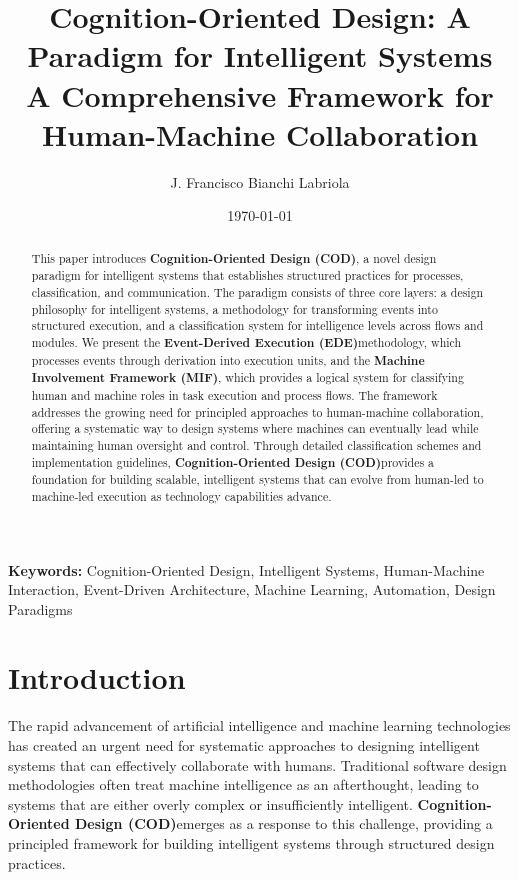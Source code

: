 \documentclass[12pt,a4paper]{article}
\title{\Large \textbf{Cognition-Oriented Design: A Paradigm for Intelligent Systems}\\[0.5cm] \large A Comprehensive Framework for Human-Machine Collaboration}
\author{J. Francisco Bianchi Labriola}
\affil{Independent author}
\date{\today}
\newcommand{\cod}{\textbf{Cognition-Oriented Design (COD)}}
\newcommand{\ede}{\textbf{Event-Derived Execution (EDE)}}
\newcommand{\mif}{\textbf{Machine Involvement Framework (MIF)}}
\begin{document}
\maketitle
\thispagestyle{empty}

\begin{abstract}
This paper introduces \cod, a novel design paradigm for intelligent systems that establishes structured practices for processes, classification, and communication. The paradigm consists of three core layers: a design philosophy for intelligent systems, a methodology for transforming events into structured execution, and a classification system for intelligence levels across flows and modules. We present the \ede methodology, which processes events through derivation into execution units, and the \mif, which provides a logical system for classifying human and machine roles in task execution and process flows. The framework addresses the growing need for principled approaches to human-machine collaboration, offering a systematic way to design systems where machines can eventually lead while maintaining human oversight and control. Through detailed classification schemes and implementation guidelines, \cod provides a foundation for building scalable, intelligent systems that can evolve from human-led to machine-led execution as technology capabilities advance.
\end{abstract}

\vspace{0.5cm}
\noindent\textbf{Keywords:} Cognition-Oriented Design, Intelligent Systems, Human-Machine Interaction, Event-Driven Architecture, Machine Learning, Automation, Design Paradigms

\newpage
\tableofcontents
\newpage

\section{Introduction}

The rapid advancement of artificial intelligence and machine learning technologies has created an urgent need for systematic approaches to designing intelligent systems that can effectively collaborate with humans. Traditional software design methodologies often treat machine intelligence as an afterthought, leading to systems that are either overly complex or insufficiently intelligent. \cod emerges as a response to this challenge, providing a principled framework for building intelligent systems through structured design practices.
\end{document}
